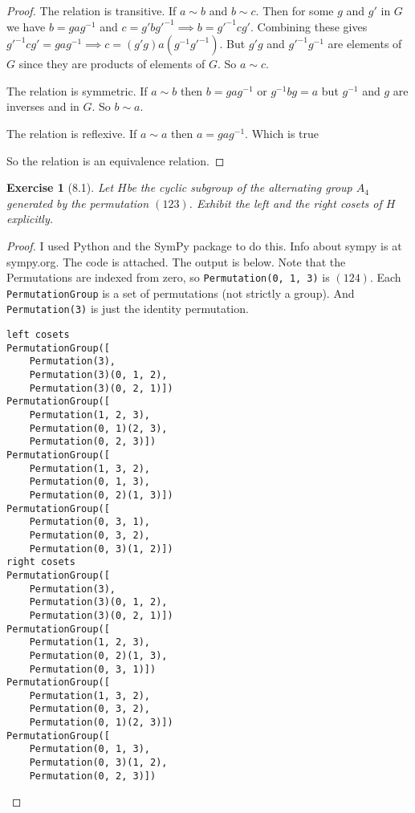 \documentclass[12pt,leqno]{article}
\numberwithin{equation}{section}
\newtheorem*{exer}{Exercise}
\theoremstyle{definition}
\begin{document}
\begin{proof}[Proof]

    The relation is transitive. If $a \sim b$ and $b \sim c$. Then for some $g$
    and $g'$ in $G$ we have $b = gag^{-1}$ and $c = g'bg'^{-1} \implies b =
    g'^{-1}cg'$. Combining these gives $g'^{-1}cg' = gag^{-1} \implies c =
    (g'g)a(g^{-1}g'^{-1})$. But $g'g$ and $g'^{-1}g^{-1}$ are elements of $G$
    since they are products of elements of $G$. So $a \sim c$.

    The relation is symmetric. If $a \sim b$ then $b = gag^{-1}$ or $g^{-1}bg =
    a$ but $g^{-1}$ and $g$ are inverses and in $G$. So $b \sim a$.

    The relation is reflexive. If $a \sim a$ then $a = gag^{-1}$. Which is true

    So the relation is an equivalence relation.

\end{proof}


\begin{exer}[8.1]
Let $H$be the cyclic subgroup of the alternating group $A_4$ generated by the permutation $(1 2 3)$. Exhibit the left and the right cosets of $H$ explicitly.
\end{exer}

\begin{proof}[Proof]

    I used Python and the SymPy package to do this. Info about sympy is at
    sympy.org.  The code is attached. The output is below. Note that
    the Permutations are indexed from zero, so \texttt{Permutation(0, 1, 3)} is
    $(124)$. Each \texttt{PermutationGroup} is a set of permutations (not
    strictly a group). And \texttt{Permutation(3)} is just the identity
    permutation.

\begin{lstlisting}
left cosets
PermutationGroup([
    Permutation(3),
    Permutation(3)(0, 1, 2),
    Permutation(3)(0, 2, 1)])
PermutationGroup([
    Permutation(1, 2, 3),
    Permutation(0, 1)(2, 3),
    Permutation(0, 2, 3)])
PermutationGroup([
    Permutation(1, 3, 2),
    Permutation(0, 1, 3),
    Permutation(0, 2)(1, 3)])
PermutationGroup([
    Permutation(0, 3, 1),
    Permutation(0, 3, 2),
    Permutation(0, 3)(1, 2)])
right cosets
PermutationGroup([
    Permutation(3),
    Permutation(3)(0, 1, 2),
    Permutation(3)(0, 2, 1)])
PermutationGroup([
    Permutation(1, 2, 3),
    Permutation(0, 2)(1, 3),
    Permutation(0, 3, 1)])
PermutationGroup([
    Permutation(1, 3, 2),
    Permutation(0, 3, 2),
    Permutation(0, 1)(2, 3)])
PermutationGroup([
    Permutation(0, 1, 3),
    Permutation(0, 3)(1, 2),
    Permutation(0, 2, 3)])
\end{lstlisting}


\end{proof}
\end{document}
